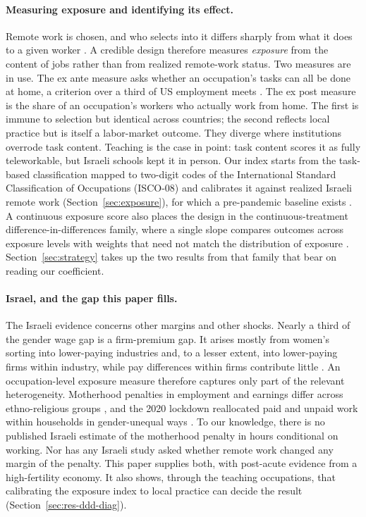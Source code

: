 \documentclass[12pt,a4paper]{article}
\begin{document}
\paragraph{Measuring exposure and identifying its effect.}
Remote work is chosen, and who selects into it differs sharply from what it does to a given
worker \citep{emanuelharrington2024}. A credible design therefore measures \emph{exposure} from
the content of jobs rather than from realized remote-work status. Two measures are in use. The
ex ante measure asks whether an occupation's tasks can all be done at home, a criterion over a
third of US employment meets \citep{dingel2020}. The ex post measure is the share of an
occupation's workers who actually work from home. The first is immune to selection but identical
across countries; the second reflects local practice but is itself a labor-market outcome. They
diverge where institutions overrode task content. Teaching is the case in point: task content
scores it as fully teleworkable, but Israeli schools kept it in person. Our index starts from the
task-based classification mapped to two-digit codes of the International Standard
Classification of Occupations (ISCO-08) and calibrates it against realized
Israeli remote work (Section~\ref{sec:exposure}), for which a pre-pandemic baseline exists
\citep{madhala2020}. A continuous exposure score also places the design in the
continuous-treatment difference-in-differences family, where a single slope compares outcomes
across exposure levels with weights that need not match the distribution of exposure
\citep{callaway2024}.
Section~\ref{sec:strategy} takes up the two results from that family that bear on reading our
coefficient.

\paragraph{Israel, and the gap this paper fills.}
The Israeli evidence concerns other margins and other shocks. Nearly a third of the gender wage
gap is a firm-premium gap. It arises mostly from women's sorting into lower-paying industries
and, to a lesser extent, into lower-paying firms within industry, while pay differences within
firms contribute little \citep{buzaglo2023}. An occupation-level exposure measure
therefore captures only part of the relevant heterogeneity. Motherhood penalties in employment
and earnings differ across ethno-religious groups \citep{budig2023}, and the 2020 lockdown
reallocated paid and unpaid work within households in gender-unequal ways \citep{yaish2021}. To
our knowledge, there is no published Israeli estimate of the motherhood penalty in hours
conditional on working. Nor has any Israeli study asked whether remote work changed any margin
of the penalty. This paper supplies both, with post-acute evidence from a high-fertility economy.
It also shows, through the teaching occupations, that calibrating the exposure index to local
practice can decide the result (Section~\ref{sec:res-ddd-diag}).
\end{document}
